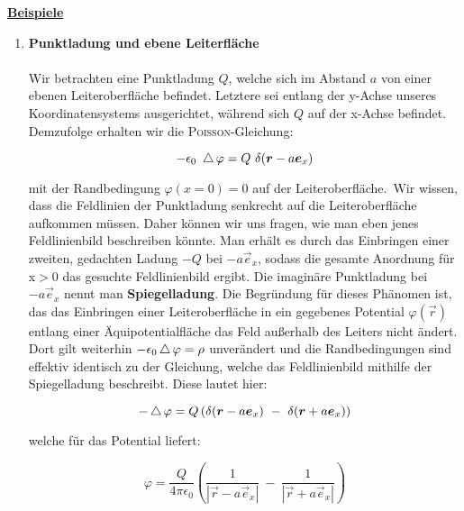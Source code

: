 \newpage
\underline{\textbf{Beispiele}}
\begin{enumerate}
\item \textbf{ Punktladung und ebene Leiterfläche}\\
\ \\
Wir betrachten eine Punktladung $Q$, welche sich im Abstand $a$ von einer ebenen Leiteroberfläche befindet. Letztere sei entlang der y-Achse unseres Koordinatensystems ausgerichtet, während sich $Q$ auf der x-Achse befindet.
Demzufolge erhalten wir die \textsc{Poisson}-Gleichung:

\begin{equation*}
-\epsilon_0 \ \laplace\varphi = Q \ \delta(\vec{r}-a\vec{e}_x)
\end{equation*}

mit der Randbedingung $\varphi(x=0) = 0$ auf der Leiteroberfläche.\
Wir wissen, dass die Feldlinien der Punktladung senkrecht auf die Leiteroberfläche aufkommen müssen. Daher können wir uns fragen, wie man eben jenes Feldlinienbild beschreiben könnte. Man erhält es durch das Einbringen einer zweiten, gedachten Ladung $-Q$ bei $-a\vec{e}_x$, sodass die gesamte Anordnung für x$>0$ das gesuchte Feldlinienbild ergibt. Die imaginäre Punktladung bei $-a\vec{e}_x$ nennt man \textbf{Spiegelladung}. Die Begründung für dieses Phänomen ist, das das Einbringen einer Leiteroberfläche in ein gegebenes Potential $\varphi (\vec{r})$ entlang einer Äquipotentialfläche das Feld außerhalb des Leiters nicht ändert. Dort gilt weiterhin $-\epsilon_0 \mathop{{}\bigtriangleup}\nolimits\varphi = \rho$ unverändert und die Randbedingungen sind effektiv identisch zu der Gleichung, welche das Feldlinienbild mithilfe der Spiegelladung beschreibt. Diese lautet hier:

\begin{equation*}
- \laplace\varphi = Q \left(\delta(\vec{r}-a\vec{e}_x) \ - \ \delta(\vec{r}+a\vec{e}_x)\right)
\end{equation*}

welche für das Potential liefert:

\begin{equation*}
\varphi = \frac{Q}{4\pi\epsilon_0} \left(\frac{1}{|\vec{r}-a\vec{e}_x|} \ - \ \frac{1}{|\vec{r}+a\vec{e}_x|}\right)
\end{equation*}
\newpage


\end{enumerate}
